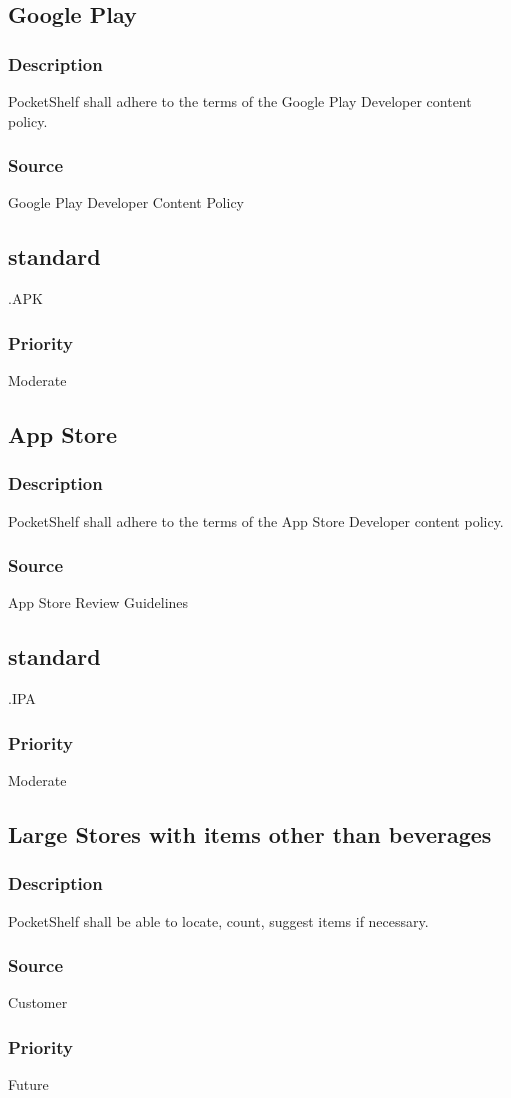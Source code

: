 \subsection{Google Play}
\subsubsection{Description}
PocketShelf shall adhere to the terms of the Google Play Developer content policy.
\subsubsection{Source}
 Google Play Developer Content Policy 
 \subsection{standard}
 .APK
\subsubsection{Priority}
Moderate\\


\subsection{App Store}
\subsubsection{Description}
PocketShelf shall adhere to the terms of the App Store Developer content policy.
\subsubsection{Source}
App Store Review Guidelines
\subsection{standard}
 .IPA
\subsubsection{Priority}
Moderate

\subsection{Large Stores with items other than beverages}
\subsubsection{Description}
PocketShelf shall be able to locate, count, suggest items if necessary.
\subsubsection{Source}
Customer
\subsubsection{Priority}
Future